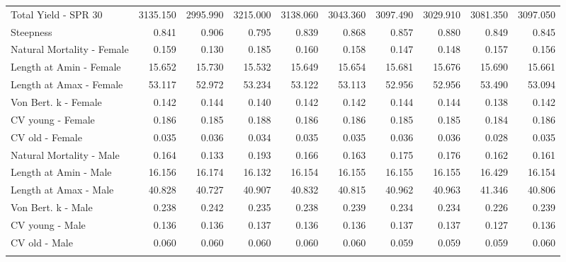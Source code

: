 \documentclass[12pt,]{article}
\begin{document}
\begin{landscape}
\begin{longtable}{lrrrrrrrrr}
  Total Yield - SPR 30 & 3135.150 & 2995.990 & 3215.000 & 3138.060 & 3043.360 & 3097.490 & 3029.910 & 3081.350 & 3097.050 \\ 
  Steepness & 0.841 & 0.906 & 0.795 & 0.839 & 0.868 & 0.857 & 0.880 & 0.849 & 0.845 \\ 
  Natural Mortality - Female & 0.159 & 0.130 & 0.185 & 0.160 & 0.158 & 0.147 & 0.148 & 0.157 & 0.156 \\ 
  Length at Amin - Female & 15.652 & 15.730 & 15.532 & 15.649 & 15.654 & 15.681 & 15.676 & 15.690 & 15.661 \\ 
  Length at Amax - Female & 53.117 & 52.972 & 53.234 & 53.122 & 53.113 & 52.956 & 52.956 & 53.490 & 53.094 \\ 
  Von Bert. k - Female & 0.142 & 0.144 & 0.140 & 0.142 & 0.142 & 0.144 & 0.144 & 0.138 & 0.142 \\ 
  CV young - Female & 0.186 & 0.185 & 0.188 & 0.186 & 0.186 & 0.185 & 0.185 & 0.184 & 0.186 \\ 
  CV old - Female & 0.035 & 0.036 & 0.034 & 0.035 & 0.035 & 0.036 & 0.036 & 0.028 & 0.035 \\ 
  Natural Mortality - Male & 0.164 & 0.133 & 0.193 & 0.166 & 0.163 & 0.175 & 0.176 & 0.162 & 0.161 \\ 
  Length at Amin - Male & 16.156 & 16.174 & 16.132 & 16.154 & 16.155 & 16.155 & 16.155 & 16.429 & 16.154 \\ 
  Length at Amax - Male & 40.828 & 40.727 & 40.907 & 40.832 & 40.815 & 40.962 & 40.963 & 41.346 & 40.806 \\ 
  Von Bert. k - Male & 0.238 & 0.242 & 0.235 & 0.238 & 0.239 & 0.234 & 0.234 & 0.226 & 0.239 \\ 
  CV young - Male & 0.136 & 0.136 & 0.137 & 0.136 & 0.136 & 0.137 & 0.137 & 0.127 & 0.136 \\ 
  CV old - Male & 0.060 & 0.060 & 0.060 & 0.060 & 0.060 & 0.059 & 0.059 & 0.059 & 0.060 \\ 
   \hline
\hline
\label{tab:sens_table}
\end{longtable}
\endgroup
\end{landscape}

\newpage

\FloatBarrier 
\end{document}
